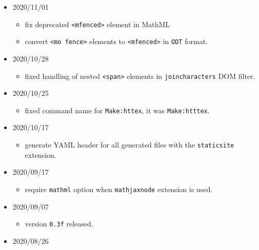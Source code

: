 \begin{itemize}
  \begin{itemize}
  \tightlist
  \item
    new extension, \texttt{build\_changed}.
  \end{itemize}
\item
  2020/11/01

  \begin{itemize}
  \tightlist
  \item
    fix deprecated \texttt{\textless{}mfenced\textgreater{}} element in
    MathML
  \item
    convert \texttt{\textless{}mo\ fence\textgreater{}} elements to
    \texttt{\textless{}mfenced\textgreater{}} in \texttt{ODT} format.
  \end{itemize}
\item
  2020/10/28

  \begin{itemize}
  \tightlist
  \item
    fixed handling of nested \texttt{\textless{}span\textgreater{}}
    elements in \texttt{joincharacters} DOM filter.
  \end{itemize}
\item
  2020/10/25

  \begin{itemize}
  \tightlist
  \item
    fixed command name for \texttt{Make:httex}, it was
    \texttt{Make:htttex}.
  \end{itemize}
\item
  2020/10/17

  \begin{itemize}
  \tightlist
  \item
    generate YAML header for all generated files with the
    \texttt{staticsite} extension.
  \end{itemize}
\item
  2020/09/17

  \begin{itemize}
  \tightlist
  \item
    require \texttt{mathml} option when \texttt{mathjaxnode} extension
    is used.
  \end{itemize}
\item
  2020/09/07

  \begin{itemize}
  \tightlist
  \item
    version \texttt{0.3f} released.
  \end{itemize}
\item
  2020/08/26


\end{itemize}
